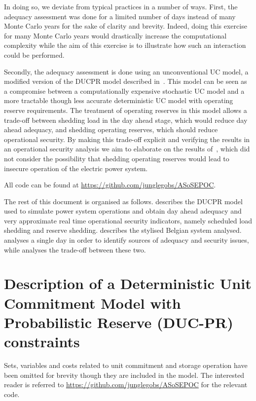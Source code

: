 \documentclass[number,times]{elsarticle}
\begin{document}
In doing so, we deviate from typical practices in a number of ways. First, the adequacy assessment was done for a limited number of days instead of many Monte Carlo years for the sake of clarity and brevity. Indeed, doing this exercise for many Monte Carlo years would drastically increase the computational complexity while the aim of this exercise is to illustrate how such an interaction could be performed.

Secondly, the adequacy assessment is done using an unconventional \ac{UC} model, a modified version of the \ac{DUCPR} model described in~\cite{Bruninx2017}. This model can be seen as a compromise between a computationally expensive stochastic \ac{UC} model and a more tractable though less accurate deterministic \ac{UC} model with operating reserve requirements. The treatment of operating reserves in this model allows a trade-off between shedding load in the day ahead stage, which would reduce day ahead adequacy, and shedding operating reserves, which should reduce operational security. By making this trade-off explicit and verifying the results in an operational security analysis we aim to elaborate on the results of~\cite{Hermans2018}, which did not consider the possibility that shedding operating reserves would lead to insecure operation of the electric power system.

All code can be found at \href{https://github.com/junglegobs/ASoSEPOC}{https://github.com/junglegobs/ASoSEPOC}.

The rest of this document is organised as follows.  describes the \ac{DUCPR} model used to simulate power system operations and obtain day ahead adequacy and very approximate real time operational security indicators, namely scheduled load shedding and reserve shedding.  describes the stylised Belgian system analysed.  analyses a single day in order to identify sources of adequacy and security issues, while  analyses the trade-off between these two.

\section{Description of a Deterministic Unit Commitment Model with Probabilistic Reserve (DUC-PR) constraints} \label{sec:model}

Sets, variables and costs related to unit commitment and storage operation have been omitted for brevity though they are included in the model. The interested reader is referred to \href{https://github.com/junglegobs/ASoSEPOC}{https://github.com/junglegobs/ASoSEPOC} for the relevant code.
\end{document}
